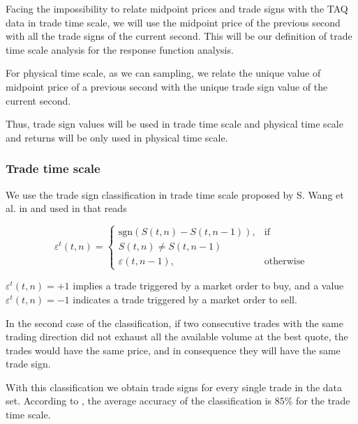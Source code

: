 Facing the impossibility to relate midpoint prices and trade signs with the TAQ
data in trade time scale, we will use the midpoint price of the previous second
with all the trade signs of the current second. This will be our definition of
trade time scale analysis for the response function analysis.

For physical time scale, as we can sampling, we relate the unique value of
midpoint price of a previous second with the unique trade sign value of the
current second.

Thus, trade sign values will be used in trade time scale and physical time
scale and returns will be only used in physical time scale.

\subsubsection{Trade time scale}\label{subsubsec:trade_time}

We use the trade sign classification in trade time scale proposed by S. Wang et
al. in \cite{Wang_2016_cross} and used in
\cite{Wang_2017,Wang_2018_copulas,Wang_2016_avg} that reads

\begin{equation}\label{eq:trade_signs_trade}
    \varepsilon^{t}\left(t,n\right)=\left\{
    \begin{array}{cc}
    \text{sgn}\left(S\left(t,n\right)-S\left(t,n-1\right)\right),
    & \text{if }\\ S\left(t,n\right) \ne S\left(t,n-1\right)\\
    \varepsilon\left(t,n-1\right),
    & \text{otherwise}
    \end{array}\right.
\end{equation}

$\varepsilon^{t}\left( t,n \right) = +1$ implies a trade triggered by a market
order to buy, and a value $\varepsilon^{t}\left( t,n \right) = -1$ indicates a
trade triggered by a market order to sell.

In the second case of the classification, if two consecutive trades with the
same trading direction did not exhaust all the available volume at the best
quote, the trades would have the same price, and in consequence they will have
the same trade sign.

With this classification we obtain trade signs for every single trade in the
data set. According to \cite{Wang_2016_cross}, the average accuracy of the
classification is $85\%$ for the trade time scale.

